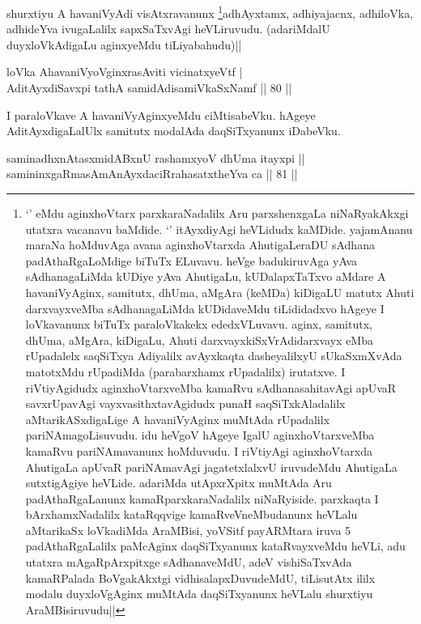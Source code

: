 \begin{artha}
shurxtiyu A havaniVyAdi visAtxravanunx \footnote[1]{`\stext' eMdu 
aginxhoVtarx parxkaraNadalilx Aru parxshenxgaLa niNaRyakAkxgi utatxra 
vacanavu baMdide. `\stext' itAyxdiyAgi heVLidudx kaMDide. yajamAnanu 
maraNa hoMduvAga avana aginxhoVtarxda AhutigaLeraDU sAdhana 
padAthaRgaLoMdige biTuTx ELuvavu. heVge badukiruvAga yAva 
sAdhanagaLiMda kUDiye yAva AhutigaLu, kUDalapxTaTxvo aMdare A 
havaniVyAginx, samitutx, dhUma, aMgAra (keMDa) kiDigaLU matutx Ahuti 
darxvayxveMba sAdhanagaLiMda kUDidaveMdu tiLididadxvo hAgeye I 
loVkavanunx biTuTx paraloVkakekx ededxVLuvavu. aginx, samitutx, dhUma, 
aMgAra, kiDigaLu, Ahuti darxvayxkiSxVrAdidarxvayx eMba rUpadalelx 
saqSiTxya Adiyalilx avAyxkaqta dasheyalilxyU sUkaSxmXvAda matotxMdu 
rUpadiMda (parabarxhamx rUpadalilx) irutatxve. I riVtiyAgidudx 
aginxhoVtarxveMba kamaRvu sAdhanasahitavAgi apUvaR savxrUpavAgi 
vayxvasithxtavAgidudx punaH saqSiTxkAladalilx aMtarikASxdigaLige A 
havaniVyAginx muMtAda rUpadalilx pariNAmagoLisuvudu. idu heVgoV hAgeye 
IgalU aginxhoVtarxveMba kamaRvu pariNAmavanunx hoMduvudu. I riVtiyAgi 
aginxhoVtarxda AhutigaLa apUvaR pariNAmavAgi jagatetxlalxvU iruvudeMdu 
AhutigaLa sutxtigAgiye heVLide. adariMda utApxrXpitx muMtAda Aru 
padAthaRgaLanunx kamaRparxkaraNadalilx niNaRyiside. parxkaqta I 
bArxhamxNadalilx kataRqqvige kamaRveVneMbudanunx heVLalu aMtarikaSx 
loVkadiMda AraMBisi, yoVSitf payARMtara iruva 5 padAthaRgaLalilx 
paMcAginx daqSiTxyanunx kataRvayxveMdu heVLi, adu utatxra 
mAgaRpArxpitxge sAdhanaveMdU, adeV vishiSaTxvAda kamaRPalada 
BoVgakAkxtgi vidhisalapxDuvudeMdU, tiLisutAtx ililx modalu 
duyxloVgAginx muMtAda daqSiTxyanunx heVLalu shurxtiyu AraMBisiruvudu||}adhAyxtamx, 
adhiyajacnx, adhiloVka, adhideYva ivugaLalilx sapxSaTxvAgi 
heVLiruvudu. (adariMdalU duyxloVkAdigaLu aginxyeMdu tiLiyabahudu)||
\end{artha}

\begin{shl}
loVka AhavaniVyoV\s ginxrasAviti vicinatxyeVtf | \\
AditAyxdiSavxpi tathA samidAdisamiVkaSxNamf \hfill|| 80 || 
\end{shl}

\begin{artha}
I paraloVkave A havaniVyAginxyeMdu ciMtisabeVku. hAgeye 
AditAyxdigaLalUlx samitutx modalAda daqSiTxyanunx iDabeVku.
\end{artha}

\begin{shl}
saminadhxnAtasxmidABxnU rashamxyoV dhUma itayxpi || \\
samininxgaRmasAmAnAyxdaciRrahasatxtheYva ca \hfill|| 81 || 
\end{shl}

